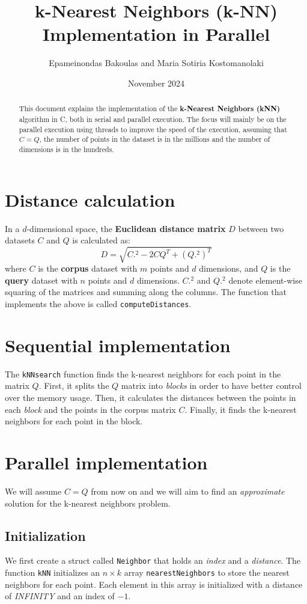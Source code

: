 \documentclass{article}
\title{k-Nearest Neighbors (k-NN) Implementation in Parallel}
\author{Epameinondas Bakoulas and Maria Sotiria Kostomanolaki}
\date{November 2024}
\begin{document}
\maketitle

\begin{abstract}
    This document explains the implementation of the \textbf{k-Nearest Neighbors (kNN)} algorithm in C, both in serial and parallel execution.
    The focus will mainly be on the parallel execution using threads to improve the speed of the execution, assuming that $C=Q$, the
    number of points in the dataset is in the millions and the number of dimensions is in the hundreds.
\end{abstract}

\section{Distance calculation}
In a $d$-dimensional space, the \textbf{Euclidean distance matrix} $D$ between two datasets 
$C$ and $Q$ is calculated as: 
\[
D = \sqrt{C.^2 - 2 C Q^T + (Q.^2)^T}
\]
where $C$ is the \textbf{corpus} dataset with $m$ points and $d$ dimensions, and $Q$ is the \textbf{query} dataset with $n$ points and $d$ dimensions.
$C.^2$ and $Q.^2$ denote element-wise squaring of the matrices and summing along the columns.
The function that implements the above is called \texttt{computeDistances}.

\section{Sequential implementation}
The \texttt{kNNsearch} function finds the k-nearest neighbors for each point in the matrix $Q$.
First, it splits the $Q$ matrix into \emph{blocks} in order to have better control over the memory usage.
Then, it calculates the distances between the points in each \emph{block} and the points in the corpus matrix $C$.
Finally, it finds the k-nearest neighbors for each point in the block.

\section{Parallel implementation}
We will assume $C=Q$ from now on and we will aim to find an \emph{approximate} solution for the k-nearest neighbors problem.

\subsection{Initialization}
We first create a struct called \texttt{Neighbor} that holds an \emph{index} and a \emph{distance}.
The function \texttt{kNN} initializes an $n \times k$ array \texttt{nearestNeighbors} to store the nearest neighbors for each point.
Each element in this array is initialized with a distance of \emph{INFINITY} and an index of $-1$.
\end{document}
